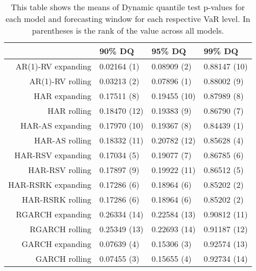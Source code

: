 \begin{table}[ht]
\centering
\begin{tabular}{rlll}
  \hline
 & 90\% DQ & 95\% DQ & 99\% DQ \\ 
  \hline
AR(1)-RV expanding & 0.02164 (1) & 0.08909 (2) & 0.88147 (10) \\ 
  AR(1)-RV rolling & 0.03213 (2) & 0.07896 (1) & 0.88002 (9) \\ 
  HAR expanding & 0.17511 (8) & 0.19455 (10) & 0.87989 (8) \\ 
  HAR rolling & 0.18470 (12) & 0.19383 (9) & 0.86790 (7) \\ 
  HAR-AS expanding & 0.17970 (10) & 0.19367 (8) & 0.84439 (1) \\ 
  HAR-AS rolling & 0.18332 (11) & 0.20782 (12) & 0.85628 (4) \\ 
  HAR-RSV expanding & 0.17034 (5) & 0.19077 (7) & 0.86785 (6) \\ 
  HAR-RSV rolling & 0.17897 (9) & 0.19922 (11) & 0.86512 (5) \\ 
  HAR-RSRK expanding & 0.17286 (6) & 0.18964 (6) & 0.85202 (2) \\ 
  HAR-RSRK rolling & 0.17286 (6) & 0.18964 (6) & 0.85202 (2) \\ 
  RGARCH expanding & 0.26334 (14) & 0.22584 (13) & 0.90812 (11) \\ 
  RGARCH rolling & 0.25349 (13) & 0.22693 (14) & 0.91187 (12) \\ 
  GARCH expanding & 0.07639 (4) & 0.15306 (3) & 0.92574 (13) \\ 
  GARCH rolling & 0.07455 (3) & 0.15655 (4) & 0.92734 (14) \\ 
   \hline
\end{tabular}
\caption[DQ test means]{This table shows the means of Dynamic quantile test p-values for each model and forecasting window for each respective VaR level. In parentheses is the rank of the value across all models. } 
\label{Table:VaR_means_DQ}
\end{table}
